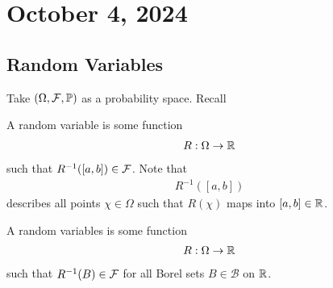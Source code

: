 \section{October 4, 2024}
\subsection{Random Variables}
Take $(\Omega, \mathcal{F}, \mathbb{P})$ as a probability space. Recall

\begin{definition}
    A random variable is some function
    \begin{align}
        R : \Omega \to \mathbb{R}
    \end{align}
    such that $R^{-1}([a,b]) \in \mathcal{F}$. Note that
    \begin{align}
        R^{-1}([a,b])
    \end{align}
    describes all points $\chi \in \Omega$ such that $R(\chi)$ maps into $[a,b] \in \mathbb{R}$.
\end{definition}
\begin{definition}
    A random variables is some function
    \begin{align}
        R: \Omega \to \mathbb{R}
    \end{align}
    such that $R^{-1}(B) \in \mathcal{F}$ for all Borel sets $B \in \mathcal{B}$ on $\mathbb{R}$.
\end{definition}


